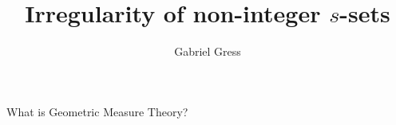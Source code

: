 \documentclass[10pt]{beamer}
\title{Irregularity of non-integer \(s\)-sets}
\author{Gabriel Gress}
\institute{Rice University \\ Department of Mathematics}
\begin{document}
\maketitle

\begin{frame}{What is Geometric Measure Theory?}
\end{frame}
\end{document}
